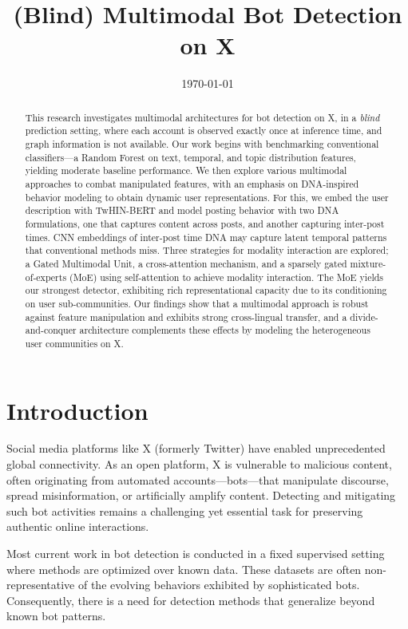 \documentclass[conference]{IEEEtran}
\title{(Blind) Multimodal Bot Detection on X}
\author{\IEEEauthorblockN{Hamza Rashid}
\IEEEauthorblockA{\textit{Project in Computer Science} \\
\textit{McGill University}\\
}
}
\date{\today}
\begin{document}
\maketitle

\begin{abstract}
This research investigates multimodal architectures
for bot detection on X, in a \emph{blind} prediction setting, 
where each account is observed exactly once at inference time,
and graph information is not available.
Our work begins with benchmarking conventional classifiers---a Random Forest 
on text, temporal, and topic distribution features, 
yielding moderate baseline performance.
We then explore various multimodal approaches
to combat manipulated features,
with an emphasis on DNA-inspired 
behavior modeling to obtain dynamic user representations.
For this, we embed the user description with 
TwHIN-BERT and model posting behavior with two DNA formulations, 
one that captures content across posts, and another capturing inter-post times.
CNN embeddings of inter-post time DNA may capture latent temporal
patterns that conventional methods miss.
Three strategies for modality interaction are explored; 
a Gated Multimodal Unit, 
a cross-attention mechanism, and a sparsely gated mixture-of-experts (MoE)
using self-attention to achieve modality interaction.
The MoE yields our strongest detector, exhibiting rich representational capacity due to its conditioning on user sub-communities.
Our findings show that a multimodal approach is robust against 
feature manipulation and exhibits strong cross-lingual transfer,
and a divide-and-conquer architecture complements these effects 
by modeling the heterogeneous user communities on X.
\end{abstract}

\section{Introduction}
Social media platforms like X (formerly Twitter) have 
enabled unprecedented global connectivity. 
As an open platform, X is vulnerable to malicious content,
often originating from automated accounts—bots—that 
manipulate discourse, spread misinformation, or 
artificially amplify content. 
Detecting and mitigating such bot activities 
remains a challenging yet essential task for 
preserving authentic online interactions.

Most current work in bot detection is conducted
in a fixed supervised setting where methods are optimized over known data. 
These datasets are often non-representative of the evolving behaviors exhibited by sophisticated bots.
Consequently, there is a need for detection methods that generalize beyond 
known bot patterns.
\end{document}
